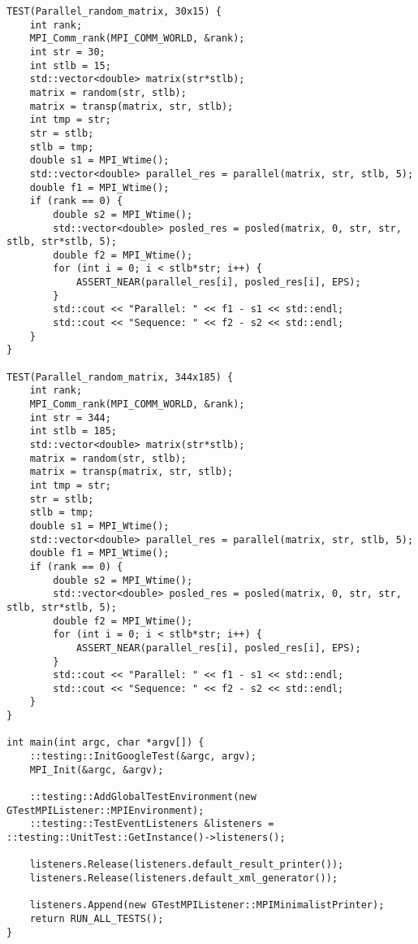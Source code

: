 \documentclass{report}
\begin{document}
\begin{lstlisting}
TEST(Parallel_random_matrix, 30x15) {
    int rank;
    MPI_Comm_rank(MPI_COMM_WORLD, &rank);
    int str = 30;
    int stlb = 15;
    std::vector<double> matrix(str*stlb);
    matrix = random(str, stlb);
    matrix = transp(matrix, str, stlb);
    int tmp = str;
    str = stlb;
    stlb = tmp;
    double s1 = MPI_Wtime();
    std::vector<double> parallel_res = parallel(matrix, str, stlb, 5);
    double f1 = MPI_Wtime();
    if (rank == 0) {
        double s2 = MPI_Wtime();
        std::vector<double> posled_res = posled(matrix, 0, str, str, stlb, str*stlb, 5);
        double f2 = MPI_Wtime();
        for (int i = 0; i < stlb*str; i++) {
            ASSERT_NEAR(parallel_res[i], posled_res[i], EPS);
        }
        std::cout << "Parallel: " << f1 - s1 << std::endl;
        std::cout << "Sequence: " << f2 - s2 << std::endl;
    }
}

TEST(Parallel_random_matrix, 344x185) {
    int rank;
    MPI_Comm_rank(MPI_COMM_WORLD, &rank);
    int str = 344;
    int stlb = 185;
    std::vector<double> matrix(str*stlb);
    matrix = random(str, stlb);
    matrix = transp(matrix, str, stlb);
    int tmp = str;
    str = stlb;
    stlb = tmp;
    double s1 = MPI_Wtime();
    std::vector<double> parallel_res = parallel(matrix, str, stlb, 5);
    double f1 = MPI_Wtime();
    if (rank == 0) {
        double s2 = MPI_Wtime();
        std::vector<double> posled_res = posled(matrix, 0, str, str, stlb, str*stlb, 5);
        double f2 = MPI_Wtime();
        for (int i = 0; i < stlb*str; i++) {
            ASSERT_NEAR(parallel_res[i], posled_res[i], EPS);
        }
        std::cout << "Parallel: " << f1 - s1 << std::endl;
        std::cout << "Sequence: " << f2 - s2 << std::endl;
    }
}

int main(int argc, char *argv[]) {
    ::testing::InitGoogleTest(&argc, argv);
    MPI_Init(&argc, &argv);

    ::testing::AddGlobalTestEnvironment(new GTestMPIListener::MPIEnvironment);
    ::testing::TestEventListeners &listeners = ::testing::UnitTest::GetInstance()->listeners();

    listeners.Release(listeners.default_result_printer());
    listeners.Release(listeners.default_xml_generator());

    listeners.Append(new GTestMPIListener::MPIMinimalistPrinter);
    return RUN_ALL_TESTS();
}


\end{lstlisting}
\end{document}
